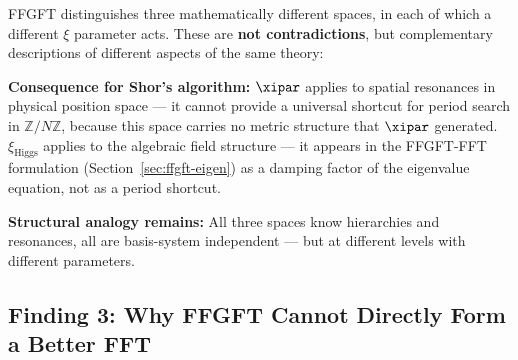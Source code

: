 \begin{foundation}
FFGFT distinguishes three mathematically different spaces,
in each of which a different $\xi$ parameter acts.
These are \textbf{not contradictions}, but complementary
descriptions of different aspects of the same theory:

\begin{center}
\end{center}

\textbf{Consequence for Shor's algorithm:}
$\xipar$ applies to spatial resonances in physical position space ---
it cannot provide a universal shortcut for period search in
$\mathbb{Z}/N\mathbb{Z}$, because this space
carries no metric structure that $\xipar$ generated.
$\xi_\text{Higgs}$ applies to the algebraic field structure ---
it appears in the FFGFT-FFT formulation (Section~\ref{sec:ffgft-eigen})
as a damping factor of the eigenvalue equation, not as a period shortcut.

\textbf{Structural analogy remains:}
All three spaces know hierarchies and resonances,
all are basis-system independent ---
but at different levels with different parameters.
\end{foundation}

\subsection{Finding 3: Why FFGFT Cannot Directly Form
  a Better FFT}


